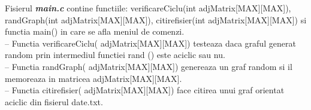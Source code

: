 \documentclass[14pt]{article}
\begin{document}
\vspace{5 mm}
Fisierul \textbf{\textit{main.c}} contine functiile: verificareCiclu(int adjMatrix[MAX][MAX]), randGraph(int adjMatrix[MAX][MAX]), citirefisier(int adjMatrix[MAX][MAX]) si functia main() in care se afla meniul de comenzi.
\vspace{2mm}
\\-- Functia verificareCiclu( adjMatrix[MAX][MAX]) testeaza daca graful generat random prin intermediul functiei rand () este aciclic sau nu.
\vspace{2mm}
\\-- Functia randGraph( adjMatrix[MAX][MAX]) genereaza un graf random si il memoreaza in matricea adjMatrix[MAX][MAX].
\vspace{2mm}
\\-- Functia citirefisier( adjMatrix[MAX][MAX]) face citirea unui graf orientat aciclic din fisierul date.txt.
\end{document}
